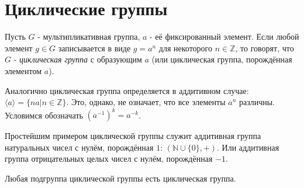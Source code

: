 \section{Циклические группы}

\begin{definition}
    Пусть $G$ - мультипликативная группа, $a$ - её фиксированный элемент.
    Если любой элемент $g\in G$ записывается в виде $g=a^n$ для некоторого $n\in \mathbb{Z}$, то говорят,
    что $G$ - {\it циклическая группа} с образующим $a$ (или циклическая группа, порождённая элементом $a$).
\end{definition}

Аналогично циклическая группа определяется в аддитивном случае:
$\langle a \rangle = \{na|n\in\mathbb{Z}\}$. Это, однако, не означает, что все элементы $a^n$ различны.
Условимся обозначать $(a^{-1})^k=a^{-k}$.

Простейшим примером циклической группы служит аддитивная группа натуральных чисел с нулём, порождённая $1$: $(\mathbb{N}\cup \{0\}, +)$. Или аддитивная группа отрицательных целых чисел с нулём, порождённая $-1$.

\begin{theorem}
    Любая подгруппа циклической группы есть циклическая группа.
\end{theorem}
